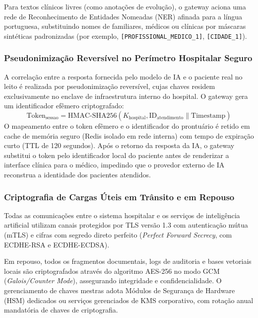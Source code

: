 Para textos clínicos livres (como anotações de evolução), o gateway aciona uma rede de Reconhecimento de Entidades Nomeadas (NER) afinada para a língua portuguesa, substituindo nomes de familiares, médicos ou clínicas por máscaras sintéticas padronizadas (por exemplo, \texttt{[PROFISSIONAL\_MEDICO\_1]}, \texttt{[CIDADE\_1]}).

\subsubsection{Pseudonimização Reversível no Perímetro Hospitalar Seguro}
A correlação entre a resposta fornecida pelo modelo de IA e o paciente real no leito é realizada por pseudonimização reversível, cujas chaves residem exclusivamente no enclave de infraestrutura interno do hospital. O gateway gera um identificador efêmero criptografado:
\begin{equation}
    \text{Token}_{\text{sessao}} = \text{HMAC-SHA256}(K_{\text{hospital}}, \text{ID}_{\text{atendimento}} \parallel \text{Timestamp})
\end{equation}
O mapeamento entre o token efêmero e o identificador do prontuário é retido em cache de memória seguro (Redis isolado em rede interna) com tempo de expiração curto (TTL de 120 segundos). Após o retorno da resposta da IA, o gateway substitui o token pelo identificador local do paciente antes de renderizar a interface clínica para o médico, impedindo que o provedor externo de IA reconstrua a identidade dos pacientes atendidos.

\subsubsection{Criptografia de Cargas Úteis em Trânsito e em Repouso}
Todas as comunicações entre o sistema hospitalar e os serviços de inteligência artificial utilizam canais protegidos por TLS versão 1.3 com autenticação mútua (mTLS) e cifras com segredo direto perfeito (\textit{Perfect Forward Secrecy}, com ECDHE-RSA e ECDHE-ECDSA).

Em repouso, todos os fragmentos documentais, logs de auditoria e bases vetoriais locais são criptografados através do algoritmo AES-256 no modo GCM (\textit{Galois/Counter Mode}), assegurando integridade e confidencialidade. O gerenciamento de chaves mestras adota Módulos de Segurança de Hardware (HSM) dedicados ou serviços gerenciados de KMS corporativo, com rotação anual mandatória de chaves de criptografia.

